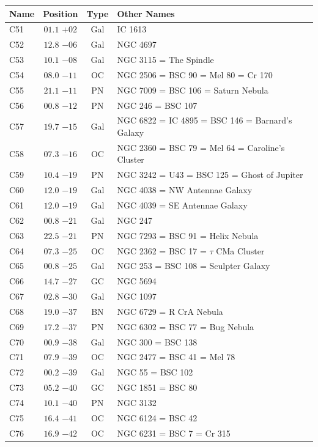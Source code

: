 \begin{table}[t]
    \setlength{\tabcolsep}{2pt}
    \footnotesize
    \begin{tabularx}{\linewidth}{lccX}
        \hline
        Name&Position&Type&Other Names\\
        \hline

C51  &$01.1$ $+02$&Gal&IC 1613\\
C52  &$12.8$ $-06$&Gal&NGC 4697\\
C53  &$10.1$ $-08$&Gal&NGC 3115 = The Spindle\\
C54  &$08.0$ $-11$&OC &NGC 2506 = BSC 90 = Mel 80 = Cr 170\\
C55  &$21.1$ $-11$&PN &NGC 7009 = BSC 106 = Saturn Nebula\\
C56  &$00.8$ $-12$&PN &NGC 246 = BSC 107\\
C57  &$19.7$ $-15$&Gal&NGC 6822 = IC 4895 = BSC 146 = Barnard's Galaxy\\
C58  &$07.3$ $-16$&OC &NGC 2360 = BSC 79 = Mel 64 = Caroline's Cluster\\
C59  &$10.4$ $-19$&PN &NGC 3242 = U43 = BSC 125 = Ghost of Jupiter\\
C60  &$12.0$ $-19$&Gal&NGC 4038 = NW Antennae Galaxy\\
C61  &$12.0$ $-19$&Gal&NGC 4039 = SE Antennae Galaxy\\
C62  &$00.8$ $-21$&Gal&NGC 247\\
C63  &$22.5$ $-21$&PN &NGC 7293 = BSC 91 = Helix Nebula\\
C64  &$07.3$ $-25$&OC &NGC 2362 = BSC 17 = $\tau$ CMa Cluster\\
C65  &$00.8$ $-25$&Gal&NGC 253 = BSC 108 = Sculpter Galaxy\\
C66  &$14.7$ $-27$&GC &NGC 5694\\
C67  &$02.8$ $-30$&Gal&NGC 1097\\
C68  &$19.0$ $-37$&BN &NGC 6729 = R CrA Nebula\\
C69  &$17.2$ $-37$&PN &NGC 6302 = BSC 77 = Bug Nebula\\
C70  &$00.9$ $-38$&Gal&NGC 300 = BSC 138\\
C71  &$07.9$ $-39$&OC &NGC 2477 = BSC 41 = Mel 78\\
C72  &$00.2$ $-39$&Gal&NGC 55 = BSC 102\\
C73  &$05.2$ $-40$&GC &NGC 1851 = BSC 80\\
C74  &$10.1$ $-40$&PN &NGC 3132\\
C75  &$16.4$ $-41$&OC &NGC 6124 = BSC 42\\
C76  &$16.9$ $-42$&OC &NGC 6231 = BSC 7 = Cr 315\\

\end{tabularx}
\end{table}
